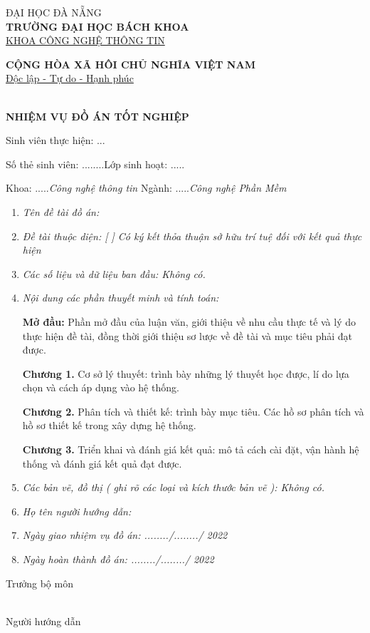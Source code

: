 
\begin{minipage}[t]{.4\textwidth}
	\centering
	ĐẠI HỌC ĐÀ NẴNG\\
	\textbf{TRƯỜNG ĐẠI HỌC BÁCH KHOA}\\
	\underline{KHOA CÔNG NGHỆ THÔNG TIN}
\end{minipage}\hfill 
\begin{minipage}[t]{.6\textwidth}
	\centering
	\textbf{CỘNG HÒA XÃ HÔI CHỦ NGHĨA VIỆT NAM}\\
	\underline{Độc lập - Tự do - Hạnh phúc}
\end{minipage}\\[2em]

\center\Large\textbf{NHIỆM VỤ ĐỒ ÁN TỐT NGHIỆP}

Sinh viên thực hiện: ...\emph\@author \dotfill

Số thẻ sinh viên: ........\emph\msv \dotfill Lớp sinh hoạt: .....\emph\myclass \dotfill

Khoa: .....\emph{Công nghệ thông tin} \dotfill  Ngành: .....\emph{Công nghệ Phần Mềm} \dotfill

\begin{enumerate}
	\item\emph{Tên đề tài đồ án: \@title}
	\item\emph{Đề tài thuộc diện: [ ] Có ký kết thỏa thuận sở hữu trí tuệ đối với kết quả thực hiện}
	\item\emph{Các số liệu và dữ liệu ban đầu: Không có.}
	\item\emph{Nội dung các phần thuyết minh và tính toán:}
	
	\textbf{Mở đầu:} Phần mở đầu của luận văn, giới thiệu về nhu cầu thực tế và lý do thực hiện đề tài, đồng thời giới thiệu sơ lược về đề tài và mục tiêu phải đạt được.
	
	\textbf{Chương 1.} Cơ sở lý thuyết: trình bày những lý thuyết học được, lí do lựa chọn và cách áp dụng vào hệ thống.
	
	\textbf{Chương 2.} Phân tích và thiết kế: trình bày mục tiêu. Các hồ sơ phân tích và hồ sơ thiết kế trong xây dựng hệ thống.
	
	\textbf{Chương 3.} Triển khai và đánh giá kết quả: mô tả cách cài đặt, vận hành hệ thống và đánh giá kết quả đạt được.
	\item\emph{Các bản vẽ, đồ thị ( ghi rõ các loại và kích thước bản vẽ ):
	Không có.}
	\item\emph{Họ tên người hướng dẫn: \advisor}
	\item\emph{Ngày giao nhiệm vụ đồ án: ......../......../ 2022 \dotfill}
	\item\emph{Ngày hoàn thành đồ án: ......../......../ 2022 \dotfill}
	
\end{enumerate}
\raggedright
\begin{minipage}[t]{.5\textwidth}
	
	Trưởng bộ môn \dotfill
\end{minipage}\hfill 
\begin{minipage}[t]{.5\textwidth}
	\center
	\@date\\
	Người hướng dẫn
\end{minipage}\\[2em]

\pagebreak